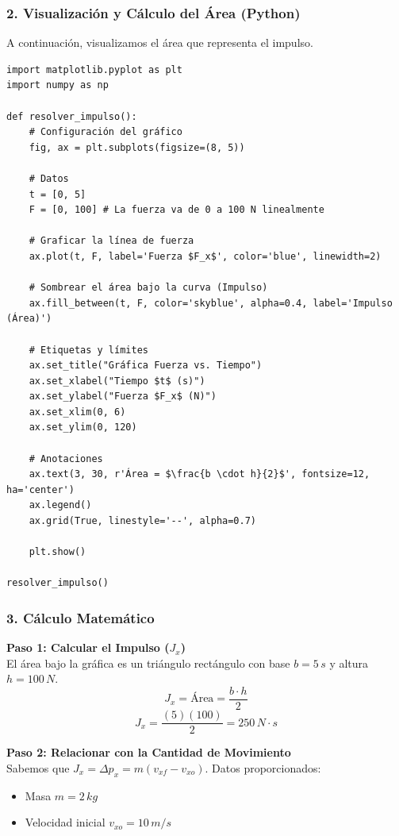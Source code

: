 \documentclass[12pt, a4paper]{article}
\begin{document}
\subsubsection*{2. Visualización y Cálculo del Área (Python)}
A continuación, visualizamos el área que representa el impulso.

\begin{lstlisting}
import matplotlib.pyplot as plt
import numpy as np

def resolver_impulso():
    # Configuración del gráfico
    fig, ax = plt.subplots(figsize=(8, 5))
    
    # Datos
    t = [0, 5]
    F = [0, 100] # La fuerza va de 0 a 100 N linealmente
    
    # Graficar la línea de fuerza
    ax.plot(t, F, label='Fuerza $F_x$', color='blue', linewidth=2)
    
    # Sombrear el área bajo la curva (Impulso)
    ax.fill_between(t, F, color='skyblue', alpha=0.4, label='Impulso (Área)')
    
    # Etiquetas y límites
    ax.set_title("Gráfica Fuerza vs. Tiempo")
    ax.set_xlabel("Tiempo $t$ (s)")
    ax.set_ylabel("Fuerza $F_x$ (N)")
    ax.set_xlim(0, 6)
    ax.set_ylim(0, 120)
    
    # Anotaciones
    ax.text(3, 30, r'Área = $\frac{b \cdot h}{2}$', fontsize=12, ha='center')
    ax.legend()
    ax.grid(True, linestyle='--', alpha=0.7)
    
    plt.show()

resolver_impulso()
\end{lstlisting}

\subsubsection*{3. Cálculo Matemático}

\textbf{Paso 1: Calcular el Impulso ($J_x$)} \\
El área bajo la gráfica es un triángulo rectángulo con base $b = 5 \, \si{s}$ y altura $h = 100 \, \si{N}$.
$$ J_x = \text{Área} = \frac{b \cdot h}{2} $$
$$ J_x = \frac{(5)(100)}{2} = 250 \, \si{N \cdot s} $$

\textbf{Paso 2: Relacionar con la Cantidad de Movimiento} \\
Sabemos que $J_x = \Delta p_x = m (v_{xf} - v_{xo})$.
Datos proporcionados:
\begin{itemize}
    \item Masa $m = 2 \, \si{kg}$
    \item Velocidad inicial $v_{xo} = 10 \, \si{m/s}$
\end{itemize}
\end{document}
